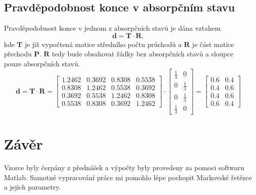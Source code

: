 \documentclass{article}
\begin{document}
		\subsection{Pravděpodobnost konce v absorpčním stavu}
			Pravděpodobnost konce v jednom z absorpčních stavů je dána vztahem \[\mathbf{d}=\mathbf{T}\cdot \mathbf{R},\] kde \(\mathbf{T}\) je již vypočtená matice středního počtu průchodů a \(\mathbf{R}\) je část matice přechodu \(\mathbf{P}\). \(\mathbf{R}\) tedy bude obsahovat řádky bez absorpčních stavů a sloupce pouze absorpčních stavů.
			\[\mathbf{d}=\mathbf{T}\cdot \mathbf{R}=
			\begin{bmatrix}
				1.2462&    0.3692&    0.8308&    0.5538\\
				0.8308&    1.2462&    0.5538&    0.3692\\
				0.3692&    0.5538&    1.2462&    0.8308\\
				0.5538&    0.8308&    0.3692&    1.2462
			\end{bmatrix}\cdot
			\begin{bmatrix}
				\frac{1}{3}&0\\
				0&\frac{1}{3}\\
				0&\frac{1}{3}\\
				\frac{1}{3}&0
			\end{bmatrix}=
			\begin{bmatrix}
				0.6    &0.4\\
				0.4    &0.6\\
				0.4    &0.6\\
				0.6    &0.4
			\end{bmatrix}\]
	\newpage
	\section{Závěr}
		Vzorce byly čerpány z přednášek a výpočty byly provedeny za pomoci softwaru Matlab. Samotné vypracování práce mi pomohlo lépe pochopit Markovské řetězce a jejich parametry.
\end{document}
